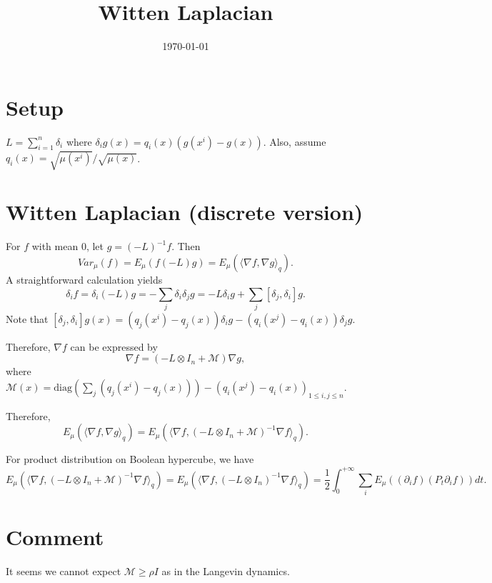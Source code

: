 \documentclass[11pt]{article}
\title{Witten Laplacian}
\author{}
\date{\today}
\theoremstyle{plain}
\theoremstyle{definition}
\theoremstyle{remark}
\begin{document}
\maketitle

\tableofcontents

\newpage

\section{Setup}

\(L = \sum_{i=1}^n \delta_i\) where \(\delta_i g(x) = q_i(x) (g(x^i) - g(x))\).
Also, assume \(q_i(x) = \sqrt{\mu(x^i)}/\sqrt{\mu(x)}\).

\section{Witten Laplacian (discrete version)}

For \(f\) with mean \(0\), let \(g = (-L)^{-1} f\). Then
\[
Var_\mu(f) = E_\mu(f (-L) g) = E_\mu(\langle \nabla f,\nabla g\rangle_q).
\]
A straightforward calculation yields
\[
\delta_i f = \delta_i (-L) g = -\sum_{j} \delta_i \delta_j g = - L \delta_i g + \sum_{j} [\delta_j,\delta_i] g.
\]
Note that
\([\delta_j,\delta_i] g(x) = (q_j(x^i) - q_j(x)) \delta_i g - (q_i(x^j) - q_i(x)) \delta_j g\).

Therefore, \(\nabla f\) can be expressed by
\[
\nabla f = (-L \otimes I_n + \mathcal{M}) \nabla g,
\]
where \(\mathcal{M}(x) = \mathrm{diag}(\sum_j (q_j(x^i) - q_j(x))) - (q_i(x^j)-q_i(x))_{1 \le i,j \le n}\).

Therefore,
\[
E_\mu(\langle \nabla f, \nabla g\rangle_q) = E_\mu(\langle \nabla f, (-L \otimes I_n + \mathcal{M})^{-1} \nabla f \rangle_q).
\]

For product distribution on Boolean hypercube, we have
\[
E_\mu(\langle \nabla f, (-L \otimes I_n + \mathcal{M})^{-1} \nabla f \rangle_q) = E_\mu(\langle \nabla f, (-L \otimes I_n)^{-1} \nabla f \rangle_q) = \frac{1}{2} \int_0^{+\infty} \sum_i E_\mu((\partial_i f)(P_t \partial_i f)) dt.
\]

\section{Comment}
 
It seems we cannot expect \(\mathcal{M} \ge \rho I\) as in the Langevin dynamics.

\end{document}
